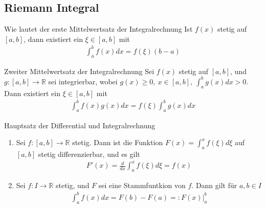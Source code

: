 \subsection{Riemann Integral}

\begin{karte}{Wie lautet der erste Mittelwertsatz der Integralrechnung}
	Ist \(f(x)\) stetig auf \([a,b]\), dann existiert ein \(\xi\in[a,b]\) mit
	\begin{align}
		\int_{a}^{b}f(x)dx=f(\xi)(b-a)
	\end{align}
\end{karte}

\begin{karte}{Zweiter Mittelwertsatz der Integralrechnung}
	Sei \(f(x)\) stetig auf \([a,b]\), und \(g:[a,b]\to \mathbb{R}\) sei integrierbar, wobei \(g(x)\geq0,\ x\in[a,b],\ \int_{a}^{b} g(x)dx>0\). Dann existiert ein \(\xi\in[a,b]\) mit
	\begin{align}
		\int_{a}^{b} f(x)g(x)dx=f(\xi)\int_{a}^{b} g(x)dx
	\end{align}
\end{karte}


\begin{karte}{Hauptsatz der Differential und Integralrechnung}
	\begin{enumerate}[label= (\roman*)]

		\item Sei \(f:[a,b] \to \mathbb{R}\) stetig. Dann ist die Funktion \(F(x) = \int_a^x f(\xi)d\xi \) auf \([a,b]\) stetig differenzierbar, und es gilt
		      \begin{align}
		      	F'(x) = \frac{d}{dx} \int_a^x f(\xi)d\xi=f(x)
		      \end{align}

		\item Sei \(f: I \to \mathbb{R}\) stetig, und \(F\) sei eine Stammfuntkion von \(f\). Dann gilt für \(a,b \in I\)
		      \begin{align}
		      	\int_a^b f(x)dx = F(b) - F(a) =: F(x)|_a^b
		      \end{align}
	\end{enumerate}
\end{karte}
